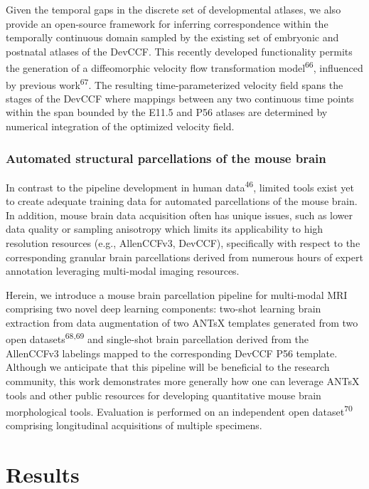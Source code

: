 \documentclass[
  12pt,
]{article}
\begin{document}
Given the temporal gaps in the discrete set of developmental atlases, we
also provide an open-source framework for inferring correspondence
within the temporally continuous domain sampled by the existing set of
embryonic and postnatal atlases of the DevCCF. This recently developed
functionality permits the generation of a diffeomorphic velocity flow
transformation model\textsuperscript{66}, influenced by previous
work\textsuperscript{67}. The resulting time-parameterized velocity
field spans the stages of the DevCCF where mappings between any two
continuous time points within the span bounded by the E11.5 and P56
atlases are determined by numerical integration of the optimized
velocity field.

\subsubsection{Automated structural parcellations of the mouse
brain}\label{automated-structural-parcellations-of-the-mouse-brain}

In contrast to the pipeline development in human
data\textsuperscript{46}, limited tools exist yet to create adequate
training data for automated parcellations of the mouse brain. In
addition, mouse brain data acquisition often has unique issues, such as
lower data quality or sampling anisotropy which limits its applicability
to high resolution resources (e.g., AllenCCFv3, DevCCF), specifically
with respect to the corresponding granular brain parcellations derived
from numerous hours of expert annotation leveraging multi-modal imaging
resources.

Herein, we introduce a mouse brain parcellation pipeline for multi-modal
MRI comprising two novel deep learning components: two-shot learning
brain extraction from data augmentation of two ANTsX templates generated
from two open datasets\textsuperscript{68,69} and single-shot brain
parcellation derived from the AllenCCFv3 labelings mapped to the
corresponding DevCCF P56 template.\\
Although we anticipate that this pipeline will be beneficial to the
research community, this work demonstrates more generally how one can
leverage ANTsX tools and other public resources for developing
quantitative mouse brain morphological tools. Evaluation is performed on
an independent open dataset\textsuperscript{70} comprising longitudinal
acquisitions of multiple specimens.

\clearpage
\newpage

\section{Results}\label{results}
\end{document}
